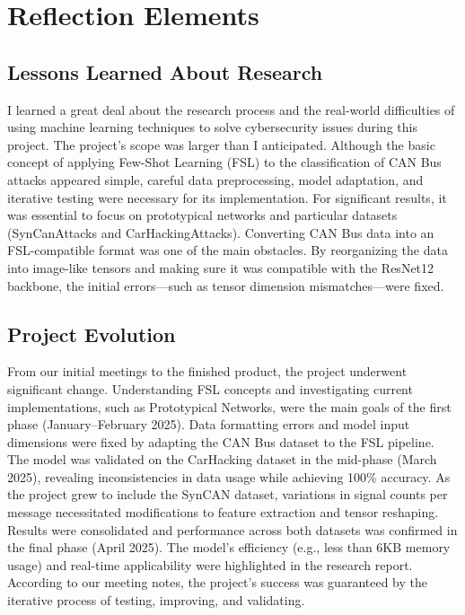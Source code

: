 \section{Reflection Elements}

\subsection{Lessons Learned About Research}
\label{subsec:lessons}
I learned a great deal about the research process and the real-world difficulties of using machine learning techniques to solve cybersecurity issues during this project. The project's scope was larger than I anticipated. Although the basic concept of applying Few-Shot Learning (FSL) to the classification of CAN Bus attacks appeared simple, careful data preprocessing, model adaptation, and iterative testing were necessary for its implementation. For significant results, it was essential to focus on prototypical networks and particular datasets (SynCanAttacks and CarHackingAttacks). Converting CAN Bus data into an FSL-compatible format was one of the main obstacles. By reorganizing the data into image-like tensors and making sure it was compatible with the ResNet12 backbone, the initial errors—such as tensor dimension mismatches—were fixed.

\subsection{Project Evolution}
\label{subsec:projectevo}
From our initial meetings to the finished product, the project underwent significant change. Understanding FSL concepts and investigating current implementations, such as Prototypical Networks, were the main goals of the first phase (January–February 2025). Data formatting errors and model input dimensions were fixed by adapting the CAN Bus dataset to the FSL pipeline. The model was validated on the CarHacking dataset in the mid-phase (March 2025), revealing inconsistencies in data usage while achieving 100\% accuracy. As the project grew to include the SynCAN dataset, variations in signal counts per message necessitated modifications to feature extraction and tensor reshaping. Results were consolidated and performance across both datasets was confirmed in the final phase (April 2025). The model's efficiency (e.g., less than 6KB memory usage) and real-time applicability were highlighted in the research report. According to our meeting notes, the project's success was guaranteed by the iterative process of testing, improving, and validating.

